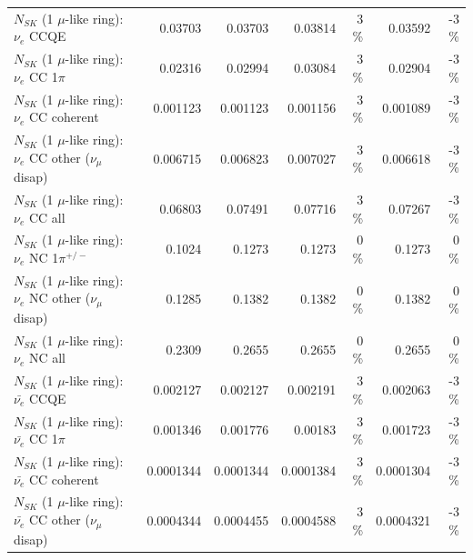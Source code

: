 \begin{table}
\begin{tabular}{| l | r | r | r  r | r  r |}
\hline
\hline
\hline
                                      $N_{SK}$ (1 $\mu$-like ring): $\nu_e$ CCQE &         0.03703 &         0.03703 &         0.03814 &        3 \%  &         0.03592 &       -3 \%  \\ 
                                 $N_{SK}$ (1 $\mu$-like ring): $\nu_e$ CC 1$\pi$ &         0.02316 &         0.02994 &         0.03084 &        3 \%  &         0.02904 &       -3 \%  \\ 
                               $N_{SK}$ (1 $\mu$-like ring): $\nu_e$ CC coherent &        0.001123 &        0.001123 &        0.001156 &        3 \%  &        0.001089 &       -3 \%  \\ 
                $N_{SK}$ (1 $\mu$-like ring): $\nu_e$ CC other ($\nu_\mu$ disap) &        0.006715 &        0.006823 &        0.007027 &        3 \%  &        0.006618 &       -3 \%  \\ 
                                  $N_{SK}$ (1 $\mu$-like ring): $\nu_{e}$ CC all &         0.06803 &         0.07491 &         0.07716 &        3 \%  &         0.07267 &       -3 \%  \\ 
\hline
                           $N_{SK}$ (1 $\mu$-like ring): $\nu_e$ NC 1$\pi^{+/-}$ &          0.1024 &          0.1273 &          0.1273 &        0 \%  &          0.1273 &        0 \%  \\ 
                $N_{SK}$ (1 $\mu$-like ring): $\nu_e$ NC other ($\nu_\mu$ disap) &          0.1285 &          0.1382 &          0.1382 &        0 \%  &          0.1382 &        0 \%  \\ 
                                  $N_{SK}$ (1 $\mu$-like ring): $\nu_{e}$ NC all &          0.2309 &          0.2655 &          0.2655 &        0 \%  &          0.2655 &        0 \%  \\ 
\hline
\hline
\hline
                                $N_{SK}$ (1 $\mu$-like ring): $\bar{\nu_e}$ CCQE &        0.002127 &        0.002127 &        0.002191 &        3 \%  &        0.002063 &       -3 \%  \\ 
                           $N_{SK}$ (1 $\mu$-like ring): $\bar{\nu_e}$ CC 1$\pi$ &        0.001346 &        0.001776 &         0.00183 &        3 \%  &        0.001723 &       -3 \%  \\ 
                         $N_{SK}$ (1 $\mu$-like ring): $\bar{\nu_e}$ CC coherent &       0.0001344 &       0.0001344 &       0.0001384 &        3 \%  &       0.0001304 &       -3 \%  \\ 
          $N_{SK}$ (1 $\mu$-like ring): $\bar{\nu_e}$ CC other ($\nu_\mu$ disap) &       0.0004344 &       0.0004455 &       0.0004588 &        3 \%  &       0.0004321 &       -3 \%  \\ 

\end{tabular}
\end{table}
